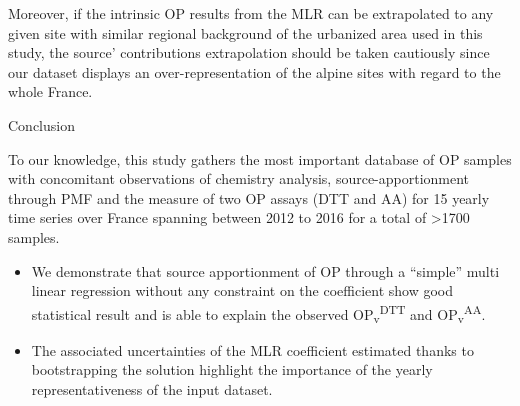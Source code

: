 \documentclass[
]{article}
\begin{document}
Moreover, if the intrinsic OP results from the MLR can be extrapolated
to any given site with similar regional background of the urbanized area
used in this study, the source' contributions extrapolation should be
taken cautiously since our dataset displays an over-representation of
the alpine sites with regard to the whole France.

Conclusion

To our knowledge, this study gathers the most important database of OP
samples with concomitant observations of chemistry analysis,
source-apportionment through PMF and the measure of two OP assays (DTT
and AA) for 15 yearly time series over France spanning between 2012 to
2016 for a total of \textgreater1700 samples.

\begin{itemize}
\item
  We demonstrate that source apportionment of OP through a ``simple''
  multi linear regression without any constraint on the coefficient show
  good statistical result and is able to explain the observed
  OP\textsubscript{v}\textsuperscript{DTT} and
  OP\textsubscript{v}\textsuperscript{AA}.
\item
  The associated uncertainties of the MLR coefficient estimated thanks
  to bootstrapping the solution highlight the importance of the yearly
  representativeness of the input dataset.
\end{itemize}
\end{document}
